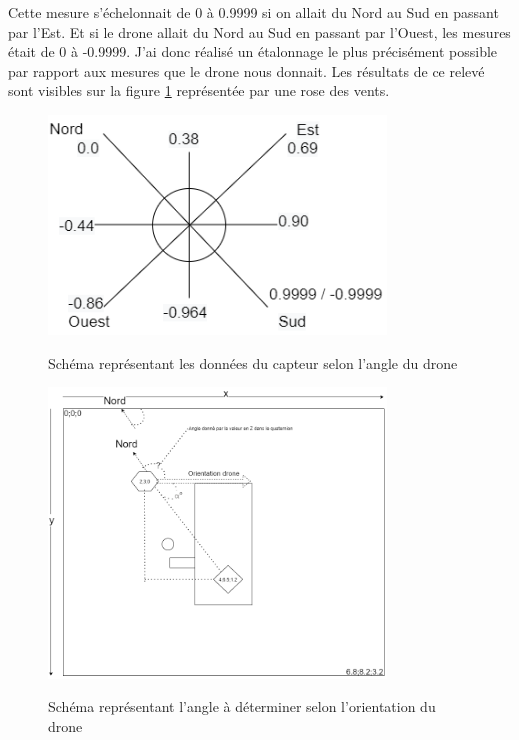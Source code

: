         Cette mesure s'échelonnait de 0 à 0.9999 si on allait du Nord au Sud en passant par l'Est. Et si le drone allait du Nord au Sud en passant par l'Ouest, les mesures était de 0 à -0.9999. J'ai donc réalisé un étalonnage le plus précisément possible par rapport aux mesures que le drone nous donnait. Les résultats de ce relevé sont visibles sur la figure \ref{fig:roseVents} représentée par une rose des vents.
        
        
        \begin{figure}[H]
            \centering
        	\begin{frame}{\includegraphics[width=0.8\textwidth]{image/roseVents.png}}
        	\end{frame}
        	\caption{\label{fig:roseVents}Schéma représentant les données du capteur selon l'angle du drone}
        \end{figure}
    
        \begin{figure}[H]
            \centering
        	\begin{frame}{\includegraphics[width=0.8\textwidth]{image/angleNordDrone.png}}
        	\end{frame}
        	\caption{\label{fig:angleNordDrone}Schéma représentant l'angle à déterminer selon l'orientation du drone}
        \end{figure}
        
